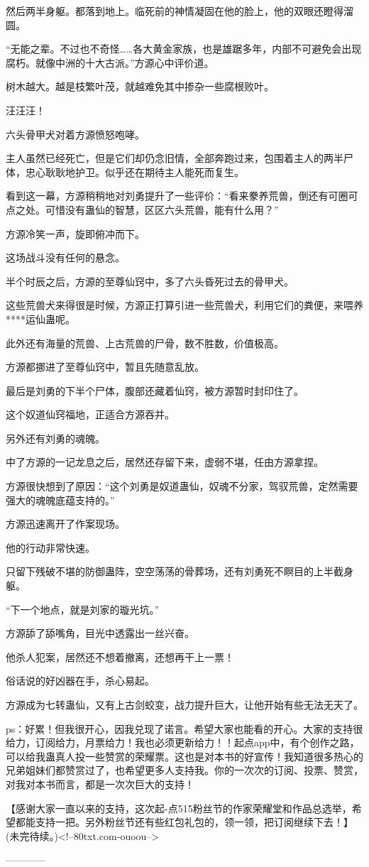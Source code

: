 \begin{this_body}
然后两半身躯。都落到地上。临死前的神情凝固在他的脸上，他的双眼还瞪得溜圆。

“无能之辈。不过也不奇怪……各大黄金家族，也是雄踞多年，内部不可避免会出现腐朽。就像中洲的十大古派。”方源心中评价道。

树木越大。越是枝繁叶茂，就越难免其中掺杂一些腐根败叶。

汪汪汪！

六头骨甲犬对着方源愤怒咆哮。

主人虽然已经死亡，但是它们却仍念旧情，全部奔跑过来，包围着主人的两半尸体，忠心耿耿地护卫。似乎还在期待主人能死而复生。

看到这一幕，方源稍稍地对刘勇提升了一些评价：“看来豢养荒兽，倒还有可圈可点之处。可惜没有蛊仙的智慧，区区六头荒兽，能有什么用？”

方源冷笑一声，旋即俯冲而下。

这场战斗没有任何的悬念。

半个时辰之后，方源的至尊仙窍中，多了六头昏死过去的骨甲犬。

这些荒兽犬来得很是时候，方源正打算引进一些荒兽犬，利用它们的粪便，来喂养****运仙蛊呢。

此外还有海量的荒兽、上古荒兽的尸骨，数不胜数，价值极高。

方源都挪进了至尊仙窍中，暂且先随意乱放。

最后是刘勇的下半个尸体，腹部还藏着仙窍，被方源暂时封印住了。

这个奴道仙窍福地，正适合方源吞并。

另外还有刘勇的魂魄。

中了方源的一记龙息之后，居然还存留下来，虚弱不堪，任由方源拿捏。

方源很快想到了原因：“这个刘勇是奴道蛊仙，奴魂不分家，驾驭荒兽，定然需要强大的魂魄底蕴支持的。”

方源迅速离开了作案现场。

他的行动非常快速。

只留下残破不堪的防御蛊阵，空空荡荡的骨葬场，还有刘勇死不瞑目的上半截身躯。

“下一个地点，就是刘家的璇光坑。”

方源舔了舔嘴角，目光中透露出一丝兴奋。

他杀人犯案，居然还不想着撤离，还想再干上一票！

俗话说的好凶器在手，杀心易起。

方源成为七转蛊仙，又有上古剑蛟变，战力提升巨大，让他开始有些无法无天了。

ps：好累！但我很开心，因我兑现了诺言。希望大家也能看的开心。大家的支持很给力，订阅给力，月票给力！我也必须更新给力！！起点app中，有个创作之路，可以给我蛊真人投一些赞赏的荣耀票。这也是对本书的好宣传！我知道很多热心的兄弟姐妹们都赞赏过了，也希望更多人支持我。你的一次次的订阅、投票、赞赏，对我对本书而言，都是一次次巨大的支持！

【感谢大家一直以来的支持，这次起-点515粉丝节的作家荣耀堂和作品总选举，希望都能支持一把。另外粉丝节还有些红包礼包的，领一领，把订阅继续下去！】(未完待续。)<!--80txt.com-ouoou-->

------------

\end{this_body}

